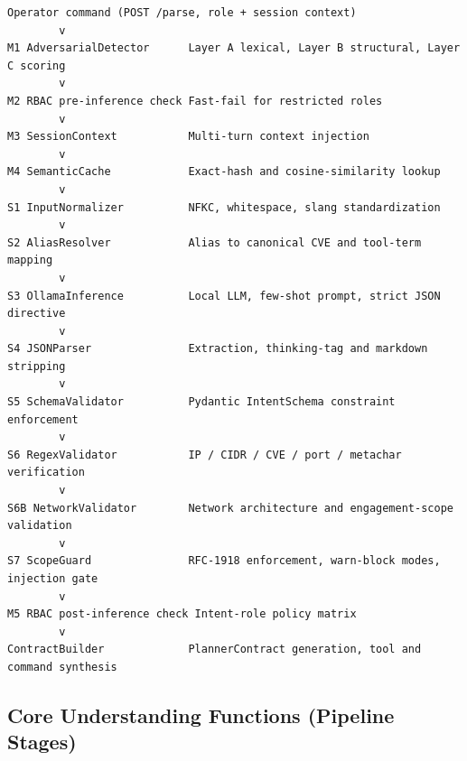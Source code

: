 \documentclass[10pt,journal,onecolumn]{IEEEtran}
\begin{document}
\begin{lstlisting}
Operator command (POST /parse, role + session context)
        v
M1 AdversarialDetector      Layer A lexical, Layer B structural, Layer C scoring
        v
M2 RBAC pre-inference check Fast-fail for restricted roles
        v
M3 SessionContext           Multi-turn context injection
        v
M4 SemanticCache            Exact-hash and cosine-similarity lookup
        v
S1 InputNormalizer          NFKC, whitespace, slang standardization
        v
S2 AliasResolver            Alias to canonical CVE and tool-term mapping
        v
S3 OllamaInference          Local LLM, few-shot prompt, strict JSON directive
        v
S4 JSONParser               Extraction, thinking-tag and markdown stripping
        v
S5 SchemaValidator          Pydantic IntentSchema constraint enforcement
        v
S6 RegexValidator           IP / CIDR / CVE / port / metachar verification
        v
S6B NetworkValidator        Network architecture and engagement-scope validation
        v
S7 ScopeGuard               RFC-1918 enforcement, warn-block modes, injection gate
        v
M5 RBAC post-inference check Intent-role policy matrix
        v
ContractBuilder             PlannerContract generation, tool and command synthesis
\end{lstlisting}

\subsection{Core Understanding Functions (Pipeline Stages)}
\end{document}
